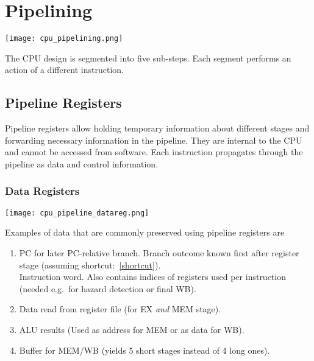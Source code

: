 \section{Pipelining}\label{pipelining}

\texttt{[image: cpu\_pipelining.png]}

The CPU design is segmented into five sub-steps. Each segment performs an action of a different instruction.

\subsection{Pipeline Registers}
Pipeline registers allow holding temporary information about different stages and forwarding necessary information in the pipeline. They are internal to the CPU and cannot be accessed from software. Each instruction propagates through the pipeline as data and control information.
\subsubsection{Data Registers}
\begin{center}
    \texttt{[image: cpu\_pipeline\_datareg.png]}
\end{center}
Examples of data that are commonly preserved using pipeline registers are
\begin{enumerate}
    \item PC for later PC-relative branch. Branch outcome known first after register stage (assuming shortcut:~\ref{shortcut}).\\
          Instruction word. Also contains indices of registers used per instruction (needed e.g.\ for hazard detection or final WB).
    \item Data read from register file (for EX \textit{and} MEM stage).
    \item ALU results (Used as address for MEM or as data for WB).
    \item Buffer for MEM/WB (yields 5 short stages instead of 4 long ones).
\end{enumerate}

